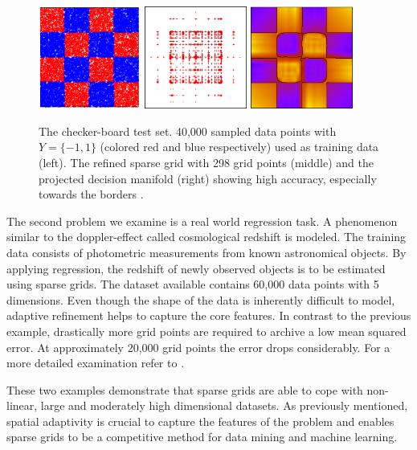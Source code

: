 \begin{figure}[t!]
  \centering
  \includegraphics[width=0.3\textwidth]{images/figure_5_1.png}
  \hspace{10px}
  \includegraphics[width=0.3\textwidth]{images/figure_5_2.png}
  \hspace{10px}
  \includegraphics[width=0.3\textwidth]{images/figure_5_3.png}
  \captionsetup{width=0.95\textwidth}
  \caption{The checker-board test set. 40,000 sampled data points with
    $Y = \{-1, 1\}$ (colored red and blue respectively)
    used as training data (left).
    The refined sparse grid with 298 grid points (middle) and the
    projected decision manifold (right) showing high accuracy, especially
    towards the borders \cite{disspfl}.
    \label{fig:fig4}}
\end{figure}


The second problem we examine is a real world regression
task.
A phenomenon similar to the doppler-effect called cosmological redshift
is modeled. The training data consists of photometric measurements from known
astronomical objects. By applying regression, the redshift of
newly observed objects is to be estimated using sparse grids.
The dataset available contains 60,000 data points with 5 dimensions. Even though
the shape of the data is inherently difficult to model, adaptive refinement
helps to capture the core features. In contrast to the previous
example, drastically more grid points are required to archive a low mean
squared error. At approximately 20,000 grid points the error drops
considerably. For a more detailed examination refer to \cite{disspfl}.
\par
These two examples demonstrate that sparse grids are able to cope with
non-linear, large and moderately high dimensional datasets. As previously
mentioned, spatial adaptivity is crucial to capture the features of the
problem and enables sparse grids to be a competitive method for data mining
and machine learning.

